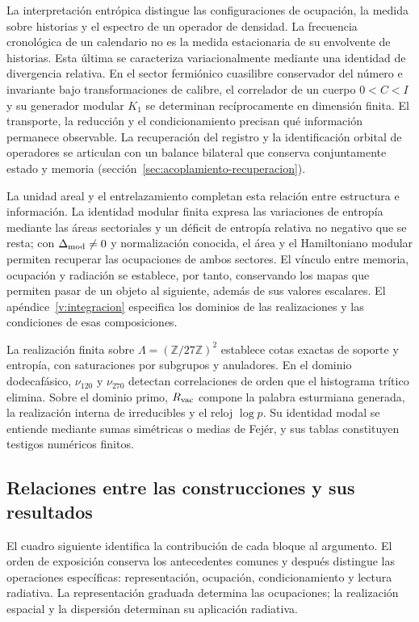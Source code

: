 La interpretación entrópica distingue las configuraciones de ocupación,
la medida sobre historias y el espectro de un operador de densidad.
La frecuencia cronológica de un calendario no es la medida estacionaria
de su envolvente de historias. Esta última se caracteriza
variacionalmente mediante una identidad de divergencia relativa.
En el sector fermiónico cuasilibre conservador del número e invariante
bajo transformaciones de calibre, el correlador de un cuerpo \(0<C<I\)
y su generador modular \(K_1\) se determinan recíprocamente en dimensión
finita. El transporte, la
reducción y el condicionamiento precisan qué información permanece
observable. La recuperación del registro y la identificación orbital de
operadores se articulan con un balance bilateral que conserva
conjuntamente estado y memoria
(sección~\ref{sec:acoplamiento-recuperacion}).

La unidad areal y el entrelazamiento completan esta relación entre
estructura e información. La identidad modular finita expresa las
variaciones de entropía mediante las áreas sectoriales y un déficit de
entropía relativa no negativo que se resta; con \(\Delta_{\rm mod}\ne0\) y
normalización conocida, el área y el Hamiltoniano modular permiten
recuperar las ocupaciones de ambos sectores. El vínculo entre memoria, ocupación y
radiación se establece, por tanto, conservando los mapas que permiten
pasar de un objeto al siguiente, además de sus valores escalares.
El apéndice~\ref{v:integracion} especifica los dominios de las
realizaciones y las condiciones de esas composiciones.

La realización finita sobre \(\Lambda=(\mathbb Z/27\mathbb Z)^2\)
establece cotas exactas de soporte y entropía, con saturaciones por
subgrupos y anuladores. En el dominio dodecafásico, \(\nu_{120}\) y
\(\nu_{270}\) detectan correlaciones de orden que el histograma trítico
elimina. Sobre el dominio primo, \(R_{\rm vac}\) compone la palabra
esturmiana generada, la realización interna de irreducibles y el reloj
\(\log p\). Su identidad modal se entiende mediante sumas simétricas o
medias de Fejér, y sus tablas constituyen testigos numéricos finitos.

\clearpage
\subsection*{Relaciones entre las construcciones y sus resultados}
El cuadro siguiente identifica la contribución de cada bloque al argumento.
El orden de exposición conserva los antecedentes comunes y después distingue
las operaciones específicas: representación, ocupación, condicionamiento y
lectura radiativa. La representación graduada determina las ocupaciones; la realización
espacial y la dispersión determinan su aplicación radiativa.

